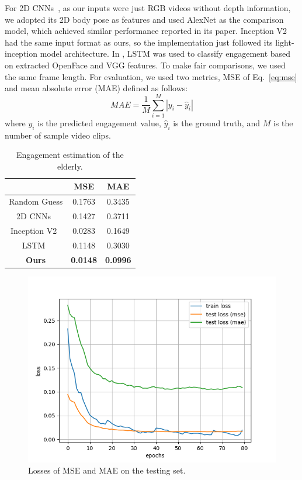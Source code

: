 \documentclass[VANCOUVER,STIX1COL]{WileyNJD-v2}
\begin{document}
For 2D CNNs~\cite{Anagnostopoulou2021Engagement}, as our inputs were just RGB videos without depth information, we adopted its 2D body pose as features and used AlexNet as the comparison model, which achieved similar performance reported in its paper. Inception V2~\cite{Saleh2021Improving} had the same input format as ours, so the implementation just followed its light-inception model architecture. In \cite{Steinert2020Engagement}, LSTM was used to classify engagement based on extracted OpenFace and VGG features. To make fair comparisons, we used the same frame length. For evaluation, we used two metrics, MSE of Eq.~\ref{eq:mse} and mean absolute error (MAE) defined as follows:
\begin{equation}
  M\!A\!E = \frac{1}{M}\sum_{i=1}^M|y_i-\hat{y}_i|
\end{equation}
where $y_i$ is the predicted engagement value, $\hat{y}_i$ is the ground truth, and $M$ is the number of sample video clips.

\begin{table}[b]
  \centering
  \caption{Engagement estimation of the elderly.}
  \label{t:main_results}
  \begin{tabular}{ccc}
  \toprule
  \textbf{} & \textbf{MSE} & \textbf{MAE} \\
  \midrule
  Random Guess & 0.1763 & 0.3435 \\
  2D CNNs~\cite{Anagnostopoulou2021Engagement} & 0.1427 & 0.3711 \\
  Inception V2~\cite{Saleh2021Improving} & 0.0283 & 0.1649 \\
  LSTM~\cite{Steinert2020Engagement} & 0.1148 & 0.3030 \\
  \midrule
  \textbf{Ours}& \textbf{0.0148} & \textbf{0.0996} \\
  \bottomrule
  \end{tabular}
\end{table}

\begin{figure}[b]
  \centering
  \includegraphics[width=0.65\linewidth]{assets/loss}
  \caption{Losses of MSE and MAE on the testing set.}
  \label{f:loss}
\end{figure}
\end{document}
